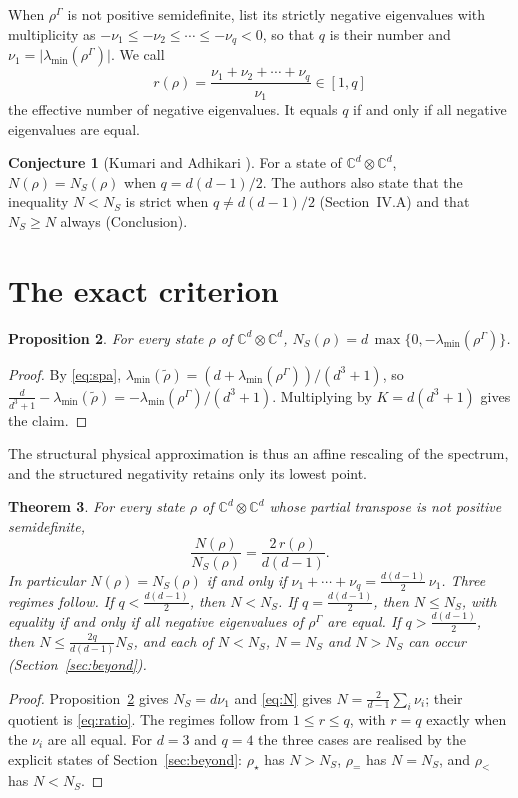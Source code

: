 \documentclass[11pt,a4paper]{article}
\newtheorem{theorem}{Theorem}
\newtheorem{proposition}[theorem]{Proposition}
\theoremstyle{definition}
\newtheorem{conjecture}[theorem]{Conjecture}
\theoremstyle{plain}
\newcommand{\C}{\mathbb{C}}
\newcommand{\NS}{N_{S}}
\newcommand{\G}{\Gamma}
\begin{document}
When $\rho^\G$ is not positive semidefinite, list its strictly negative
eigenvalues with multiplicity as $-\nu_1\le-\nu_2\le\cdots\le-\nu_q<0$, so
that $q$ is their number and $\nu_1=\lvert\lambda_{\min}(\rho^\G)\rvert$. We
call
\begin{equation}\label{eq:r}
r(\rho)=\frac{\nu_1+\nu_2+\cdots+\nu_q}{\nu_1}\in[1,q]
\end{equation}
the effective number of negative eigenvalues. It equals $q$ if and only if
all negative eigenvalues are equal.

\begin{conjecture}[Kumari and Adhikari \cite{KumariAdhikari2022}]
\label{conj:KA}
For a state of $\C^d\otimes\C^d$, $N(\rho)=\NS(\rho)$ when $q=d(d-1)/2$.
The authors also state that the inequality $N<\NS$ is strict when
$q\ne d(d-1)/2$ (Section~IV.A) and that $\NS\ge N$ always (Conclusion).
\end{conjecture}

\section{The exact criterion}\label{sec:criterion}
\begin{proposition}\label{prop:ns}
For every state $\rho$ of $\C^d\otimes\C^d$,
$\NS(\rho)=d\,\max\{0,-\lambda_{\min}(\rho^\G)\}$.
\end{proposition}
\begin{proof}
By \eqref{eq:spa}, $\lambda_{\min}(\tilde\rho)=(d+\lambda_{\min}(\rho^\G))/(d^3+1)$,
so $\frac{d}{d^3+1}-\lambda_{\min}(\tilde\rho)=-\lambda_{\min}(\rho^\G)/(d^3+1)$.
Multiplying by $K=d(d^3+1)$ gives the claim.
\end{proof}

The structural physical approximation is thus an affine rescaling of the
spectrum, and the structured negativity retains only its lowest point.

\begin{theorem}\label{thm:criterion}
For every state $\rho$ of $\C^d\otimes\C^d$ whose partial transpose is not
positive semidefinite,
\begin{equation}\label{eq:ratio}
\frac{N(\rho)}{\NS(\rho)}=\frac{2\,r(\rho)}{d(d-1)} .
\end{equation}
In particular $N(\rho)=\NS(\rho)$ if and only if
$\nu_1+\cdots+\nu_q=\frac{d(d-1)}{2}\,\nu_1$. Three regimes follow. If
$q<\frac{d(d-1)}{2}$, then $N<\NS$. If $q=\frac{d(d-1)}{2}$, then $N\le\NS$,
with equality if and only if all negative eigenvalues of $\rho^\G$ are equal.
If $q>\frac{d(d-1)}{2}$, then $N\le\frac{2q}{d(d-1)}\NS$, and each of $N<\NS$,
$N=\NS$ and $N>\NS$ can occur (Section~\ref{sec:beyond}).
\end{theorem}
\begin{proof}
Proposition~\ref{prop:ns} gives $\NS=d\nu_1$ and \eqref{eq:N} gives
$N=\frac{2}{d-1}\sum_i\nu_i$; their quotient is \eqref{eq:ratio}. The
regimes follow from $1\le r\le q$, with $r=q$ exactly when the $\nu_i$ are
all equal. For $d=3$ and $q=4$ the three cases are realised by the explicit
states of Section~\ref{sec:beyond}: $\rho_\star$ has $N>\NS$, $\rho_=$ has
$N=\NS$, and $\rho_<$ has $N<\NS$.
\end{proof}
\end{document}
